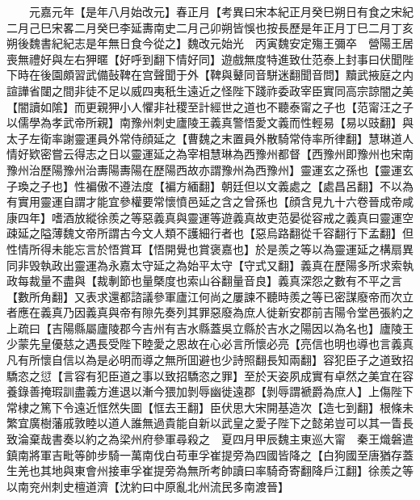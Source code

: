 　　元嘉元年【是年八月始改元】春正月【考異曰宋本紀正月癸巳朔日有食之宋紀二月己巳宋畧二月癸巳李延夀南史二月己卯朔皆悞也按長歷是年正月丁巳二月丁亥朔後魏書紀紀志是年無日食今從之】魏改元始光　丙寅魏安定殤王彌卒　營陽王居喪無禮好與左右狎暱【好呼到翻下情好同】遊戲無度特進致仕范泰上封事曰伏聞陛下時在後園頗習武備鼔鞞在宫聲聞于外【鞞與鼙同音駢迷翻聞音問】黷武掖庭之内諠譁省闥之間非徒不足以威四夷秖生遠近之怪陛下踐祚委政宰臣實同高宗諒闇之美【闇讀如隂】而更親狎小人懼非社稷至計經世之道也不聽泰甯之子也【范甯汪之子以儒學為孝武帝所親】南豫州刺史廬陵王義真警悟愛文義而性輕易【易以豉翻】與太子左衛率謝靈運員外常侍顔延之【曹魏之末置員外散騎常侍率所律翻】慧琳道人情好欵密嘗云得志之日以靈運延之為宰相慧琳為西豫州都督【西豫州即豫州也宋南豫州治歷陽豫州治夀陽夀陽在歷陽西故亦謂豫州為西豫州】靈運玄之孫也【靈運玄子瑍之子也】性褊傲不遵法度【褊方緬翻】朝廷但以文義處之【處昌呂翻】不以為有實用靈運自謂才能宜參權要常懷憤邑延之含之曾孫也【顔含見九十六卷晉成帝咸康四年】嗜酒放縱徐羨之等惡義真與靈運等遊義真故吏范晏從容戒之義真曰靈運空疎延之隘薄魏文帝所謂古今文人類不護細行者也【惡烏路翻從千容翻行下孟翻】但性情所得未能忘言於悟賞耳【悟開覺也賞褒嘉也】於是羨之等以為靈運延之構扇異同非毁執政出靈運為永嘉太守延之為始平太守【守式又翻】義真在歷陽多所求索執政每裁量不盡與【裁剸節也量槩度也索山谷翻量音良】義真深怨之數有不平之言【數所角翻】又表求還都諮議參軍廬江何尚之屢諫不聽時羨之等已密謀廢帝而次立者應在義真乃因義真與帝有隙先奏列其罪惡廢為庶人徙新安郡前吉陽令堂邑張約之上疏曰【吉陽縣屬廬陵郡今吉州有吉水縣蓋吳立縣於吉水之陽因以為名也】廬陵王少蒙先皇優慈之遇長受陛下睦愛之恩故在心必言所懷必亮【亮信也明也導也言義真凡有所懷自信以為是必明而導之無所囬避也少詩照翻長知兩翻】容犯臣子之道致招驕恣之愆【言容有犯臣道之事以致招驕恣之罪】至於天姿夙成實有卓然之美宜在容養錄善掩瑕訓盡義方進退以漸今猥加剝辱幽徙遠郡【剝辱謂褫爵為庶人】上傷陛下常棣之篤下令遠近恇然失圖【恇去王翻】臣伏思大宋開基造次【造七到翻】根條未繁宜廣樹藩戚敦睦以道人誰無過貴能自新以武皇之愛子陛下之懿弟豈可以其一眚長致淪棄哉書奏以約之為梁州府參軍尋殺之　夏四月甲辰魏主東巡大甯　秦王熾磐遣鎮南將軍吉毗等帥步騎一萬南伐白苟車孚崔提旁為四國皆降之【白狗國至唐猶存蓋生羌也其地與東會州接車孚崔提旁為無所考帥讀曰率騎奇寄翻降戶江翻】徐羨之等以南兖州刺史檀道濟【沈約曰中原亂北州流民多南渡晉】

